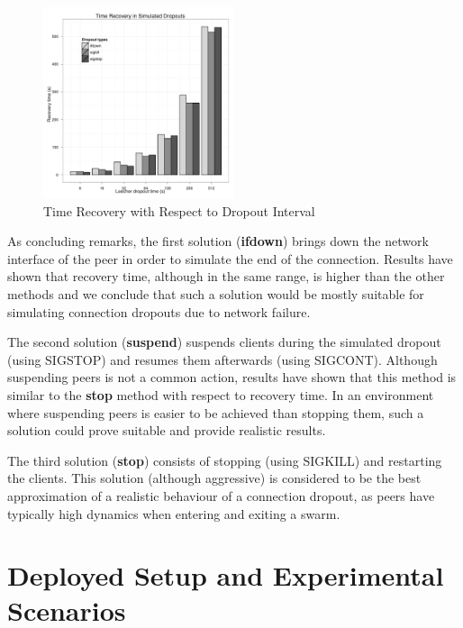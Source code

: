 \begin{figure}[h]
  \begin{center}
    \includegraphics[width=0.5\textwidth]{src/img/virt-infra/recovery-in-simulated-dropouts.pdf}
  \end{center}
  \caption{Time Recovery with Respect to Dropout Interval}
  \label{fig:virt-infra:time-recovery}
\end{figure}

As concluding remarks, the first solution (\textbf{ifdown}) brings down the
network interface of the peer in order to simulate the end of the connection.
Results have shown that recovery time, although in the same range, is higher
than the other methods and we conclude that such a solution would be mostly
suitable for simulating connection dropouts due to network failure.

The second solution (\textbf{suspend}) suspends clients during the simulated
dropout (using SIGSTOP) and resumes them afterwards (using SIGCONT). Although
suspending peers is not a common action, results have shown that this method
is similar to the \textbf{stop} method with respect to recovery time. In an
environment where suspending peers is easier to be achieved than stopping them,
such a solution could prove suitable and provide realistic results.

The third solution (\textbf{stop}) consists of stopping (using SIGKILL) and
restarting the clients. This solution (although aggressive) is considered to
be the best approximation of a realistic behaviour of a connection dropout, as
peers have typically high dynamics when entering and exiting a swarm.

\section{Deployed Setup and Experimental Scenarios}
\label{sec:virt-infra:setup-scenarios}

